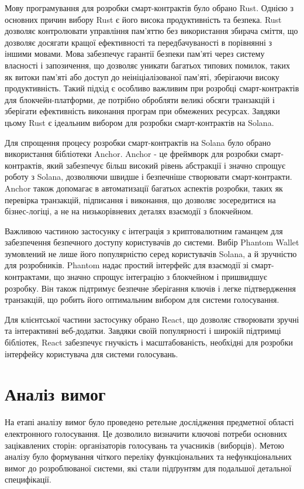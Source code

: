 \documentclass[14pt]{extreport}
\begin{document}
  Мову програмування для розробки смарт-контрактів було обрано Rust. Однією з основних причин вибору Rust є його висока продуктивність та безпека. Rust дозволяє контролювати управління пам'яттю без використання збирача сміття, що дозволяє досягати кращої ефективності та передбачуваності в порівнянні з іншими мовами. Мова забезпечує гарантії безпеки пам'яті через систему власності і запозичення, що дозволяє уникати багатьох типових помилок, таких як витоки пам'яті або доступ до неініціалізованої пам'яті, зберігаючи високу продуктивність. Такий підхід є особливо важливим при розробці смарт-контрактів для блокчейн-платформи, де потрібно обробляти великі обсяги транзакцій і зберігати ефективність виконання програм при обмежених ресурсах. Завдяки цьому Rust є ідеальним вибором для розробки смарт-контрактів на Solana.

  Для спрощення процесу розробки смарт-контрактів на Solana було обрано використання бібліотеки Anchor. Anchor - це фреймворк для розробки смарт-контрактів, який забезпечує більш високий рівень абстракції і значно спрощує роботу з Solana, дозволяючи швидше і безпечніше створювати смарт-контракти. Anchor також допомагає в автоматизації багатьох аспектів розробки, таких як перевірка транзакцій, підписання і виконання, що дозволяє зосередитися на бізнес-логіці, а не на низькорівневих деталях взаємодії з блокчейном.

  Важливою частиною застосунку є інтеграція з криптовалютним гаманцем для забезпечення безпечного доступу користувачів до системи. Вибір Phantom Wallet зумовлений не лише його популярністю серед користувачів Solana, а й зручністю для розробників. Phantom надає простий інтерфейс для взаємодії зі смарт-контрактами, що значно спрощує інтеграцію з блокчейном і пришвидшує розробку. Він також підтримує безпечне зберігання ключів і легке підтвердження транзакцій, що робить його оптимальним вибором для системи голосування.

  Для клієнтської частини застосунку обрано React, що дозволяє створювати зручні та інтерактивні веб-додатки. Завдяки своїй популярності і широкій підтримці бібліотек, React забезпечує гнучкість і масштабованість, необхідні для розробки інтерфейсу користувача для системи голосувань.
  
  \section{Аналіз вимог}
  
  На етапі аналізу вимог було проведено ретельне дослідження предметної області електронного голосування. Це дозволило визначити ключові потреби основних зацікавлених сторін: організаторів голосувань та учасників (виборців). Метою аналізу було формування чіткого переліку функціональних та нефункціональних вимог до розроблюваної системи, які стали підґрунтям для подальшої детальної специфікації.
  
\end{document}
